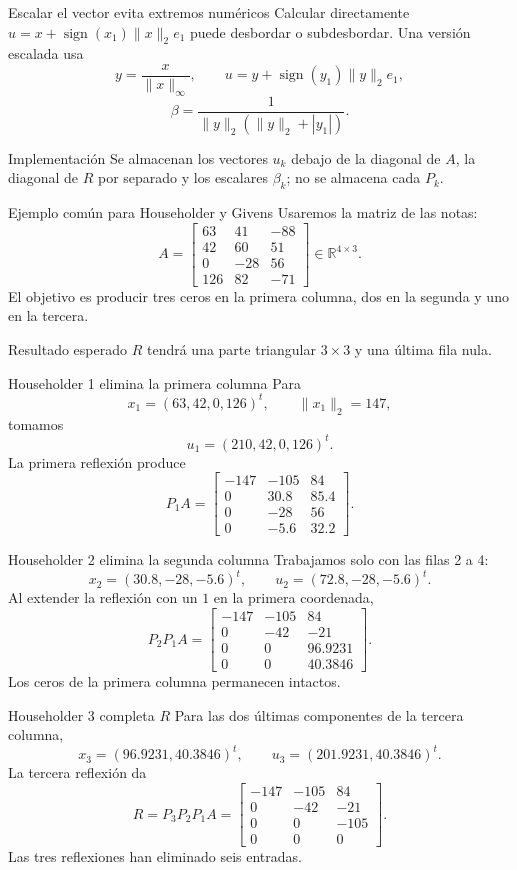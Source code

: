 \documentclass[aspectratio=169,12pt]{beamer}
\newcommand{\R}{\mathbb{R}}
\newcommand{\mat}[1]{\begin{bmatrix}#1\end{bmatrix}}
\DeclareMathOperator{\sgn}{sign}
\begin{document}
\begin{frame}{Escalar el vector evita extremos numéricos}
Calcular directamente $u=x+\sgn(x_1)\|x\|_2e_1$ puede desbordar o subdesbordar.
Una versión escalada usa
\[
y=\frac{x}{\|x\|_\infty},
\qquad
u=y+\sgn(y_1)\|y\|_2e_1,
\]
\[
\beta=\frac{1}{\|y\|_2(\|y\|_2+|y_1|)}.
\]
\begin{block}{Implementación}
Se almacenan los vectores $u_k$ debajo de la diagonal de $A$, la diagonal de
$R$ por separado y los escalares $\beta_k$; no se almacena cada $P_k$.
\end{block}
\end{frame}

\begin{frame}{Ejemplo común para Householder y Givens}
Usaremos la matriz de las notas:
\[
A=\mat{
63&41&-88\\
42&60&51\\
0&-28&56\\
126&82&-71}
\in\R^{4\times3}.
\]
El objetivo es producir tres ceros en la primera columna, dos en la segunda y
uno en la tercera.
\begin{block}{Resultado esperado}
$R$ tendrá una parte triangular $3\times3$ y una última fila nula.
\end{block}
\end{frame}

\begin{frame}{Householder 1 elimina la primera columna}
Para
\[
x_1=(63,42,0,126)^t,
\qquad \|x_1\|_2=147,
\]
tomamos
\[
u_1=(210,42,0,126)^t.
\]
La primera reflexión produce
\[
P_1A=\mat{
-147&-105&84\\
0&30.8&85.4\\
0&-28&56\\
0&-5.6&32.2}.
\]
\end{frame}

\begin{frame}{Householder 2 elimina la segunda columna}
Trabajamos solo con las filas 2 a 4:
\[
x_2=(30.8,-28,-5.6)^t,
\qquad
u_2=(72.8,-28,-5.6)^t.
\]
Al extender la reflexión con un $1$ en la primera coordenada,
\[
P_2P_1A=\mat{
-147&-105&84\\
0&-42&-21\\
0&0&96.9231\\
0&0&40.3846}.
\]
Los ceros de la primera columna permanecen intactos.
\end{frame}

\begin{frame}{Householder 3 completa $R$}
Para las dos últimas componentes de la tercera columna,
\[
x_3=(96.9231,40.3846)^t,
\qquad
u_3=(201.9231,40.3846)^t.
\]
La tercera reflexión da
\[
R=P_3P_2P_1A=
\mat{-147&-105&84\\0&-42&-21\\0&0&-105\\0&0&0}.
\]
Las tres reflexiones han eliminado seis entradas.
\end{frame}
\end{document}
